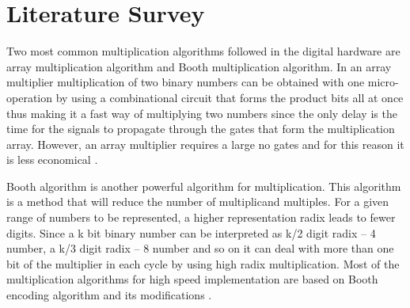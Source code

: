 \chapter{Literature Survey}

%

Two most common multiplication algorithms followed in the digital hardware are array multiplication algorithm and Booth multiplication algorithm.
In an array multiplier multiplication of two binary numbers can be obtained with one micro-operation by using a combinational circuit that forms the product bits all at once thus making it a fast way of multiplying two numbers since the only delay is the time for the signals to propagate through the gates that form the multiplication array. However, an array multiplier requires a large no gates and for this reason it is less economical \cite{r4}.

Booth algorithm is another powerful algorithm for multiplication. This algorithm is a method that will reduce the number of multiplicand multiples. For a given range of numbers to be represented, a higher representation radix leads to fewer digits. Since a k bit binary number can be interpreted as k/2 digit radix – 4 number, a k/3 digit radix – 8 number and so on it can deal with more than one bit of the multiplier in each cycle by using high radix multiplication. Most of the multiplication algorithms for high speed implementation are based on Booth encoding algorithm and its modifications \cite{r2}.

